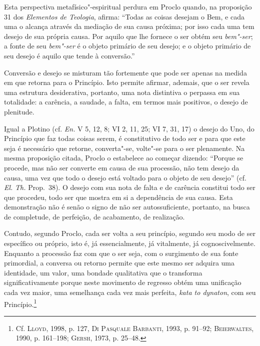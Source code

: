 Esta perspectiva metafísico"-espiritual perdura em Proclo quando, na proposição
31 dos \textit{Elementos de Teologia}, afirma: ``Todas as coisas desejam o Bem,
e cada
uma o alcança através da mediação de sua causa próxima; por isso cada uma tem
desejo de sua própria causa. Por aquilo que lhe fornece o ser obtém seu
\textit{bem"-ser}; a fonte de seu \textit{bem"-ser} é o objeto primário de seu
desejo; e o objeto primário de seu desejo é aquilo que tende à conversão.''

Conversão e desejo se misturam tão fortemente que pode ser apenas na medida em
que retorna para o Princípio. Isto permite afirmar, ademais, que o ser revela
uma estrutura desiderativa, portanto, uma nota distintiva o perpassa em sua
totalidade: a carência, a saudade, a falta, em termos mais
positivos, o desejo de plenitude. 

Igual a Plotino (cf. \textit{En.} V 5, 12, 8; VI 2, 11, 25; VI 7, 31, 17) o
desejo do Uno, do Princípio que faz todas coisas serem, é constitutivo de todo
ser e para que este seja é necessário que retorne, converta"-se, volte"-se para o
ser plenamente. Na mesma proposição citada, Proclo o estabelece ao começar
dizendo: 
``Porque se procede, mas não ser converte em causa de sua processão, não tem
desejo da causa, uma vez que todo o desejo está voltado para o objeto de seu
desejo'' (cf. \textit{El.} \textit{Th.} Prop.~38). O desejo com sua nota
de falta e de carência constitui todo ser que procedeu, todo ser que mostra em
si a dependência de sua causa. Esta demonstração não é senão o signo de não ser
autossuficiente, portanto, na busca de completude, de perfeição, de acabamento,
de realização.

Contudo, segundo Proclo, cada ser volta a seu princípio, segundo seu modo de ser
específico ou próprio, isto é, já essencialmente, já vitalmente, já
cognoscivelmente. Enquanto a processão faz com que o ser seja, com o surgimento de
sua fonte primordial, a conversa ou retorno permite  que este mesmo ser adquira
uma identidade, um valor, uma bondade qualitativa que o transforma
significativamente porque neste movimento de regresso obtém uma unificação cada
vez maior, uma semelhança cada vez mais perfeita, \textit{kata to dynaton}, com
seu Princípio.\footnote{Cf. \textsc{Lloyd}, 1998, p. 127, \textsc{Di Pasquale
Barbanti}, 1993, p. 91--92;
\textsc{Beierwaltes}, 1990, p. 161--198; \textsc{Gersh}, 1973, p. 25--48.}


